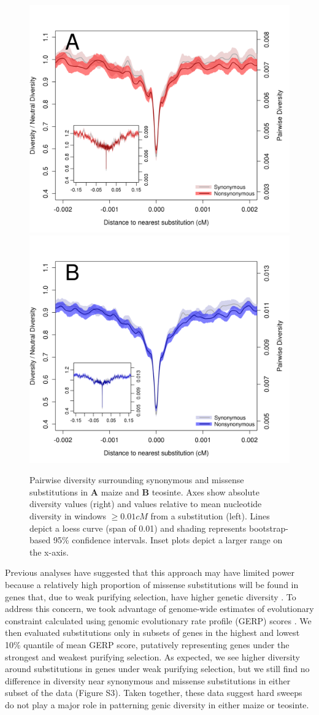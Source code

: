 \documentclass[12pt,a4paper]{article}
\begin{document}
\begin{figure}[tb]
\centering
\includegraphics[width=.45\textwidth]{FigsAndFiles/plotDiversity_TvM_Folded2_Significance_Aug}
\hspace{0.05\textwidth} \includegraphics[width=.45\textwidth]{FigsAndFiles/plotDiversity_TvT_Folded2_Significance_Aug}
\caption{Pairwise diversity surrounding synonymous and missense  substitutions in {\bf A} maize and {\bf B} teosinte. Axes show absolute diversity values (right) and values relative to mean nucleotide diversity in windows $\geq 0.01 cM$ from a substitution (left).  Lines depict a loess curve (span of 0.01) and shading represents bootstrap-based 95\% confidence intervals. Inset plots depict a larger range on the x-axis. \label{fig:hardSweeps}}
\end{figure}

Previous analyses have suggested that this approach may have limited power because a relatively high proportion of missense substitutions will be found in genes that, due to weak purifying selection, have higher genetic diversity \cite{enard2014}. 
To address this concern, we took advantage of genome-wide estimates of evolutionary constraint \cite{rodgers2015} calculated using genomic evolutionary rate profile (GERP) scores \cite{davydov2010}. 
We then evaluated substitutions only in subsets of genes in the highest and lowest 10\% quantile of mean GERP score, putatively representing genes under the strongest and weakest purifying selection. 
As expected, we see higher diversity around substitutions in genes under weak purifying selection, but we still find no difference in diversity near synonymous and missense substitutions in either subset of the data (Figure S3).
Taken together, these data suggest hard sweeps do not play a major role in patterning genic diversity in either maize or teosinte.
\end{document}
